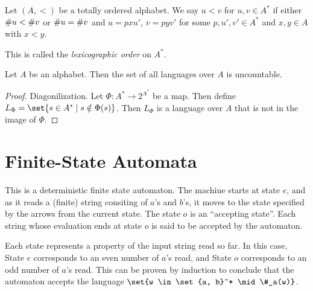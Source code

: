 \begin{definition*} \label{def:languages:lexicographic}
    Let $(A, <)$ be a totally ordered alphabet.
    We say $u < v$ for $u, v \in A^*$ if either $\# u < \# v$ or
    $\# u = \# v$ and $u = pxu'$, $v = pyv'$ for some $p, u', v' \in A^*$
    and $x, y \in A$ with $x < y$.

    This is called the \emph{lexicographic order} on $A^*$.
\end{definition*}

\begin{proposition}
    Let $A$ be an alphabet.
    Then the set of all languages over $A$ is uncountable.
\end{proposition}
\begin{proof}
    Diagonilization.
    Let $\Phi\colon A^* \to 2^{A^*}$ be a map.
    Then define $L_\Phi = \set{s \in A^* \mid s \notin \Phi(s)}$.
    Then $L_\Phi$ is a language over $A$ that is not in the image of $\Phi$.
\end{proof}

\chapter{Finite-State Automata} \label{chp:fa}
\begin{center}
\end{center}
This is a deterministic finite state automaton.
The machine starts at state $e$,
and as it reads a (finite) string consiting of $a$'s and $b$'s,
it moves to the state specified by the arrows from the current state.
The state $o$ is an ``accepting state''.
Each string whose evaluation ends at state $o$ is said to be accepted by the
automaton.

Each state represents a property of the input string read so far.
In this case, State $e$ corresponds to an even number of $a$'s read,
and State $o$ corresponds to an odd number of $a$'s read.
This can be proven by induction to conclude that the automaton accepts the
language $\set{w \in \set{a, b}^* \mid \#_a(w)}$.

